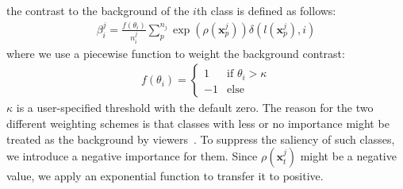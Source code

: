 the contrast to the background of the $i$th class is defined as follows:
\begin{align}\label{eq:ctbc}
 \beta^j_i = \frac{f(\theta_i)}{n^j_i}\sum^{n_j}_{p} \exp(\rho(\mathbf{x}^j_p)) \delta(l(\mathbf{x}^j_p),i)
\end{align}
where we use a piecewise function to weight the background contrast:
\begin{align}
f(\theta_i) =  \left\{ \begin{array}{ll}
1 & \textrm{if $\theta_i>\kappa$}\\
-1 & \textrm{else}
\end{array} \right.
\label{eq:piecewiseFunc}
\end{align}
$\kappa$ is a user-specified threshold with the default zero. The reason for the two different weighting schemes is that classes with less or no importance might be treated as the background by viewers~\cite{zhang2018review}. To suppress the saliency of such classes, we introduce a negative importance for them. Since $\rho (\mathbf{x}^j_t)$ might be a negative value, we apply an exponential function to transfer it to positive.


